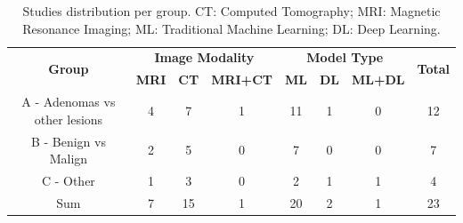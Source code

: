 \documentclass{article}
\begin{document}
\begin{table}[]
    \centering
    \begin{tabular}{cccccccc}\toprule
        \multirow{2}{*}{\textbf{Group}} & \multicolumn{3}{c}{\textbf{Image Modality}} & \multicolumn{3}{c}{\textbf{Model Type}} & \multirow{2}{*}{\textbf{Total}}
        \\\cmidrule(lr){2-4} \cmidrule(lr){5-7}
                                        & \textbf{MRI}                                & \textbf{CT}                             & \textbf{MRI+CT}                 & \textbf{ML} & \textbf{DL} & \textbf{ML+DL}      \\\midrule
        A - Adenomas vs other lesions   & 4                                           & 7                                       & 1                               & 11          & 1           & 0              & 12 \\
        B - Benign vs Malign            & 2                                           & 5                                       & 0                               & 7           & 0           & 0              & 7  \\
        C - Other                       & 1                                           & 3                                       & 0                               & 2           & 1           & 1              & 4  \\
        Sum                             & 7                                           & 15                                      & 1                               & 20          & 2           & 1              & 23 \\
        \bottomrule
    \end{tabular}
    \caption{Studies distribution per group. CT: Computed Tomography; MRI: Magnetic Resonance Imaging; ML: Traditional Machine Learning; DL: Deep Learning.}
    \label{tab:sota_sum}
\end{table}
\end{document}
